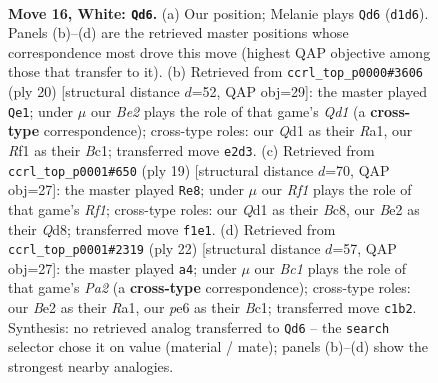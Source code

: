 \documentclass[11pt]{article}
\begin{document}
\clearpage

\begin{figure}[p]\centering
\begin{subfigure}{0.46\textwidth}\centering
\resizebox{\linewidth}{!}{%
\newchessgame
\chessboard[
  setfen={r1b2rk1/pp2qppp/2n1pn2/2P5/2P5/4P3/P1N1BPPP/1RBQ1RK1 w - - 9 16},
  showmover=false,
  pgfstyle=straightmove, color=movearrow, markmove={d1-d6}
]}
\caption{}
\end{subfigure}\hfill
\begin{subfigure}{0.46\textwidth}\centering
\resizebox{\linewidth}{!}{%
\newchessgame
\chessboard[
  setfen={rnb2rk1/1pq2ppp/p2ppn2/8/4PP2/1NPB4/P1P3PP/R1BQ1RK1 w - - 2 11},
  showmover=false,
  pgfstyle=straightmove, color=movearrow, markmove={d1-e1}
]}
\caption{}
\end{subfigure}
\\[4pt]
\begin{subfigure}{0.46\textwidth}\centering
\resizebox{\linewidth}{!}{%
\newchessgame
\chessboard[
  setfen={r1bq1rk1/pp1nbppp/2p2p2/8/2PP4/3B1N2/PP2QPPP/R1B2RK1 b - - 0 10},
  showmover=false,
  pgfstyle=straightmove, color=movearrow, markmove={f8-e8}
]}
\caption{}
\end{subfigure}\hfill
\begin{subfigure}{0.46\textwidth}\centering
\resizebox{\linewidth}{!}{%
\newchessgame
\chessboard[
  setfen={r1b2rk1/p2pqppp/2p2n2/4p3/2P1P3/2PB4/P3QPPP/R1B2RK1 w - - 1 12},
  showmover=false,
  pgfstyle=straightmove, color=movearrow, markmove={a2-a4}
]}
\caption{}
\end{subfigure}
\caption{\textbf{Move 16, White: \texttt{Qd6}.} (a) Our position; Melanie plays \texttt{Qd6} (\texttt{d1d6}). Panels (b)--(d) are the retrieved master positions whose correspondence most drove this move (highest QAP objective among those that transfer to it). (b) Retrieved from \texttt{ccrl\_top\_p0000\#3606} (ply 20) [structural distance $d$=52, QAP obj=29]: the master played \texttt{Qe1}; under $\mu$ our \emph{Be2} plays the role of that game's \emph{Qd1} (a \textbf{cross-type} correspondence); cross-type roles: our \emph{Q}d1 as their \emph{R}a1, our \emph{R}f1 as their \emph{B}c1; transferred move \texttt{e2d3}. (c) Retrieved from \texttt{ccrl\_top\_p0001\#650} (ply 19) [structural distance $d$=70, QAP obj=27]: the master played \texttt{Re8}; under $\mu$ our \emph{Rf1} plays the role of that game's \emph{Rf1}; cross-type roles: our \emph{Q}d1 as their \emph{B}c8, our \emph{B}e2 as their \emph{Q}d8; transferred move \texttt{f1e1}. (d) Retrieved from \texttt{ccrl\_top\_p0001\#2319} (ply 22) [structural distance $d$=57, QAP obj=27]: the master played \texttt{a4}; under $\mu$ our \emph{Bc1} plays the role of that game's \emph{Pa2} (a \textbf{cross-type} correspondence); cross-type roles: our \emph{B}e2 as their \emph{R}a1, our \emph{p}e6 as their \emph{B}c1; transferred move \texttt{c1b2}. Synthesis: no retrieved analog transferred to \texttt{Qd6} -- the \texttt{search} selector chose it on value (material / mate); panels (b)--(d) show the strongest nearby analogies.}
\label{fig:thought-m30}
\end{figure}
\end{document}
